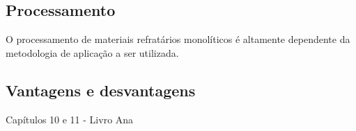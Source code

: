     \subsection{Processamento}
      O processamento de materiais refratários monolíticos é altamente dependente da metodologia de aplicação a ser utilizada.


    \subsection{Vantagens e desvantagens}
      Capítulos 10 e 11 - Livro Ana
